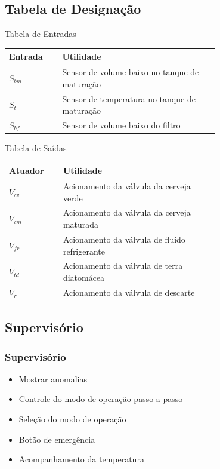 \documentclass{beamer}
\begin{document}
\subsection{Tabela de Designação}
\begin{frame}
	\begin{block}{Tabela de Entradas}
	\begin{table}[H]
	\centering
	\begin{tabular}{|  p{0.15\linewidth} | p{0.55\linewidth} | }
		\hline
		Entrada & Utilidade\\
		\hline
		$S_{bm}$ & Sensor de volume baixo no tanque de maturação \\
		$S_t$ & Sensor de temperatura no tanque de maturação \\
		$S_{bf}$ & Sensor de volume baixo do filtro \\
		\hline
		\end{tabular}
	\end{table}
	\end{block}
\end{frame}
\begin{frame}
	\begin{block}{Tabela de Saídas}
		\begin{table}[H]
			\centering
			\begin{tabular}{|  p{0.15\linewidth} | p{0.55\linewidth} | }
				\hline
				Atuador & Utilidade\\
				\hline
				$V_{cv}$ & Acionamento da válvula da cerveja verde \\
				$V_{cm}$ & Acionamento da válvula da cerveja maturada \\
				$V_{fr}$ & Acionamento da válvula de fluido refrigerante \\
				$V_{td}$ & Acionamento da válvula de terra diatomácea \\
				$V_r$ & Acionamento da válvula de descarte \\
				\hline
			\end{tabular}
		\end{table}
	\end{block}
\end{frame}
\subsection{Supervisório}
\begin{frame}
	\frametitle{Supervisório}
		\begin{itemize}
			\item Mostrar anomalias
			\item Controle do modo de operação passo a passo
			\item Seleção do modo de operação
			\item Botão de emergência
			\item Acompanhamento da temperatura
		\end{itemize}
\end{frame}

\end{document}
